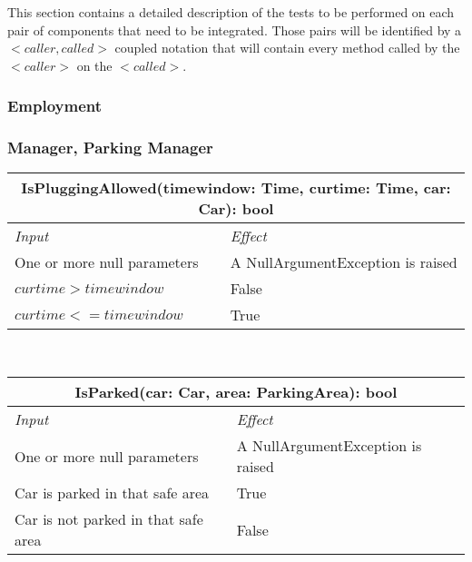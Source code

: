 	This section contains a detailed description of the tests to be performed on each pair of components that need to be integrated. Those pairs will be identified by a $< caller, called >$ coupled notation that will contain every method called by the $< caller >$ on the $< called >$. 

	\subsubsection{Employment}
		
		
		\subsubsection*{Manager, Parking Manager}
		
			\begin{tabular}{ |l|l| }
				\hline
				\multicolumn{2}{|c|}{IsPluggingAllowed(timewindow: Time, curtime: Time, car: Car): bool}\\
				\hline
				\textit{Input} & \textit{Effect}\\ \hline
				One or more null parameters & A NullArgumentException is raised\\ \hline
				$curtime > timewindow$ & False\\ \hline
				$curtime <= timewindow$ & True\\ \hline
			\end{tabular}
			\\
			\begin{tabular}{ |l|l| }
				\hline
				\multicolumn{2}{|c|}{IsParked(car: Car, area: ParkingArea): bool}\\
				\hline
				\textit{Input} & \textit{Effect}\\ \hline
				One or more null parameters & A NullArgumentException is raised\\ \hline
				Car is parked in that safe area & True\\ \hline
				Car is not parked in that safe area & False\\ \hline
			\end{tabular}
			\\
			
